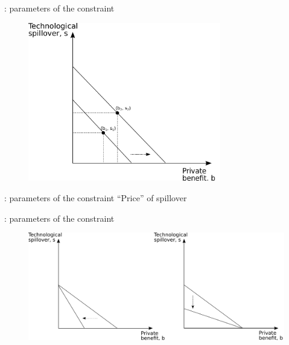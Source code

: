\documentclass[14pt]{beamer}
\begin{document}
\begin{frame}{\secname: parameters of the constraint}
\begin{figure}
	\centering
    \includegraphics[width=0.75\textwidth, height=0.75\textheight,keepaspectratio]{../figure/budget_constraint}
    \label{fig:budget_constraint}
\end{figure}
\end{frame}

\begin{frame}{\secname: parameters of the constraint}
 ``Price'' of spillover

\end{frame}

\begin{frame}{\secname: parameters of the constraint}
\begin{figure}
	\centering
    \includegraphics[width=\textwidth, height=\textheight,keepaspectratio]{../figure/absorptive_capacity}
    \label{fig:relative_price}
\end{figure}
\end{frame}
\end{document}
